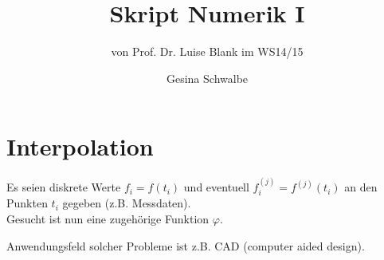 \documentclass[ngerman,fontsize=11pt, paper=a4, parskip=half, titlepage=true, toc=bib]{scrbook}
\theoremstyle{definition}
\theoremstyle{plain}
\begin{document}
\frontmatter	%

\title{Skript Numerik I}
\subtitle{von Prof. Dr. Luise Blank im WS14/15}
\author{Gesina Schwalbe}
\maketitle

\tableofcontents

\mainmatter		%













%


\chapter{Interpolation}

Es seien diskrete Werte $f_i=f(t_i)$ und 
eventuell $f_i^{(j)} = f^{(j)}(t_i)$ 
an den Punkten $t_i$ gegeben (z.B. Messdaten).\\
Gesucht ist nun eine zugehörige Funktion $\varphi$.

Anwendungsfeld solcher Probleme ist z.B. CAD (computer aided
design).
\end{document}
